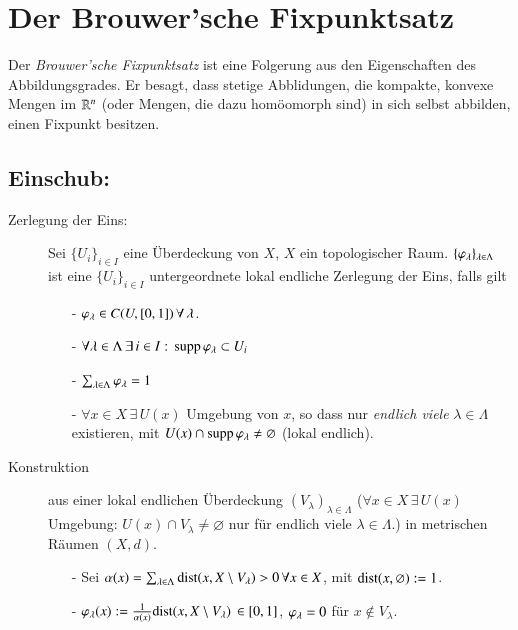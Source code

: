 \section{Der Brouwer'sche Fixpunktsatz}

Der \textit{Brouwer'sche Fixpunktsatz} ist eine Folgerung aus den Eigenschaften des Abbildungsgrades.
Er besagt, dass stetige Abblidungen, die kompakte, konvexe Mengen im $\mathbb{R}^n$ (oder Mengen, die dazu
homöomorph sind) in sich selbst abbilden, einen Fixpunkt besitzen.

\subsection*{Einschub:}

\begin{description}
        \item[Zerlegung der Eins:]
        Sei $\{U_i\}_{i\in I}$ eine Überdeckung von $X$, $X$ ein topologischer Raum.
        $\{\varphi_\lambda\}_{\lambda\in\Lambda}$ ist eine $\{U_i\}_{i\in I}$ untergeordnete lokal endliche
        Zerlegung der Eins, falls gilt
        \begin{itemize}
        \item[-] $\varphi_\lambda \in C(U,[0,1]) \,\forall\, \lambda$.
        \item[-] $\forall \lambda\in \Lambda\, \exists \, i \in I: \, \mathrm{supp}\, \varphi_\lambda\subset U_i$
        \item[-] $\sum_{\lambda \in \Lambda} \varphi _\lambda=1$
        \item[-] $\forall x \in X \, \exists \, U(x)$ Umgebung von $x$, so dass nur
        \textit{endlich viele} $\lambda \in \Lambda$ existieren, mit $U(x)\cap \mathrm{supp}\, \varphi_\lambda\neq 
        \varnothing$ (lokal endlich).
        \end{itemize}
        \item[Konstruktion] aus einer lokal endlichen Überdeckung $(V_\lambda)_{\lambda\in\Lambda}$ 
        ($\forall x\in X \, \exists \, U(x)$ Umgebung: $U(x)\cap V_\lambda\neq \varnothing$ nur für
         endlich viele $\lambda\in \Lambda$.) in metrischen Räumen $(X,d)$.
        \begin{itemize}
            \item[-] Sei $\alpha(x)=\sum_{\lambda\in \Lambda} \mathrm{dist}(x,X\setminus V_\lambda)>0 \, \forall
            x \in X$, mit $\mathrm{dist}(x,\varnothing):=1$.
            \item[-] $\varphi _\lambda(x):=\frac{1}{\alpha(x)}\mathrm{dist}(x,X\setminus V_\lambda) \, \in [0,1]$,
            $\varphi_\lambda=0$ für $x\nin V_\lambda$.

\end{itemize}
\end{description}
